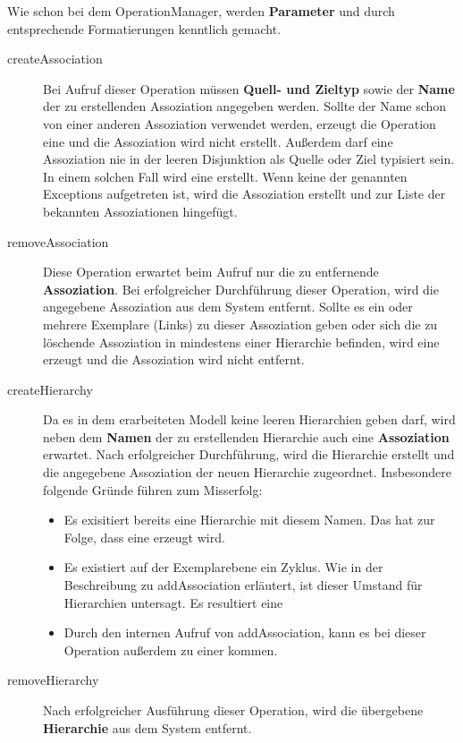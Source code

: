 Wie schon bei dem OperationManager, werden \textbf{Parameter} und  durch entsprechende Formatierungen kenntlich gemacht.

\begin{description}
\item[createAssociation] Bei Aufruf dieser Operation müssen \textbf{Quell- und Zieltyp} sowie der \textbf{Name} der zu erstellenden Assoziation 
angegeben werden.
Sollte der Name schon von einer anderen Assoziation verwendet werden, erzeugt die Operation eine  und die Assoziation wird nicht
erstellt. Außerdem darf eine Assoziation nie in der leeren Disjunktion als Quelle oder Ziel typisiert sein. In einem solchen Fall
wird eine  erstellt.
Wenn keine der genannten Exceptions aufgetreten ist, wird die Assoziation erstellt und zur Liste der bekannten Assoziationen hingefügt. 
\item[removeAssociation] Diese Operation erwartet beim Aufruf nur die zu entfernende \textbf{Assoziation}. 
Bei erfolgreicher Durchführung dieser Operation, wird die
angegebene Assoziation aus dem System entfernt.
Sollte es ein oder mehrere Exemplare (Links) zu dieser Assoziation geben oder sich die zu löschende Assoziation in mindestens einer Hierarchie befinden, wird eine  erzeugt und die Assoziation wird nicht entfernt. 
\item[createHierarchy] Da es in dem erarbeiteten Modell keine leeren Hierarchien geben darf, wird neben dem \textbf{Namen} der zu erstellenden Hierarchie auch eine 
\textbf{Assoziation} erwartet. Nach erfolgreicher Durchführung, wird die Hierarchie erstellt und die angegebene Assoziation der neuen Hierarchie zugeordnet.
Insbesondere folgende Gründe führen zum Misserfolg:
\begin{itemize}
\item Es exisitiert bereits eine Hierarchie mit diesem Namen. Das hat zur Folge, dass eine  erzeugt wird.
\item Es existiert auf der Exemplarebene ein Zyklus. Wie in der Beschreibung zu addAssociation erläutert, ist dieser Umstand für Hierarchien untersagt.
 Es resultiert eine 
 \item Durch den internen Aufruf von addAssociation, kann es bei dieser Operation außerdem zu einer  kommen.
\end{itemize}
\item[removeHierarchy] Nach erfolgreicher Ausführung dieser Operation, wird die übergebene \textbf{Hierarchie} aus dem System entfernt. 

\end{description}
